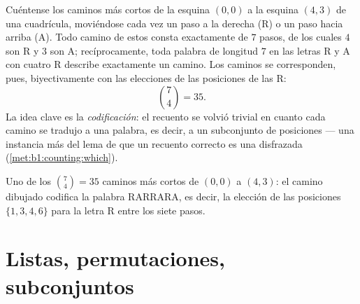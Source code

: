 \begin{example}\label{ex:b1:counting:paths}
Cuéntense los caminos más cortos de la esquina $(0,0)$ a la esquina
$(4, 3)$ de una cuadrícula, moviéndose cada vez un paso a la derecha
(R) o un paso hacia arriba (A). Todo camino de estos consta
exactamente de $7$ pasos, de los cuales $4$ son R y $3$ son A;
recíprocamente, toda palabra de longitud $7$ en las letras R y A con
cuatro R describe exactamente un camino. Los caminos se corresponden,
pues, biyectivamente con las elecciones de las posiciones de las R:
\[
\binom{7}{4} = 35 .
\]
La idea clave es la \emph{codificación}: el recuento se volvió trivial
en cuanto cada camino se tradujo a una palabra, es decir, a un
subconjunto de posiciones --- una instancia más del lema de que un
recuento correcto es una  disfrazada (\cref{met:b1:counting:which}).
\end{example}

\begin{omfigure}

{\small Uno de los $\binom74 = 35$ caminos más cortos de $(0,0)$ a
$(4,3)$: el camino dibujado codifica la palabra RARRARA, es decir, la
elección de las posiciones $\{1,3,4,6\}$ para la letra R entre los
siete pasos.}
\end{omfigure}

\section{Listas, permutaciones, subconjuntos}


